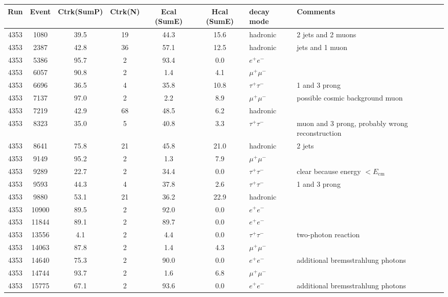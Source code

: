 \begin{tabular}{ccccccll}
	\toprule
	Run & Event & Ctrk(SumP) & Ctrk(N) & Ecal (SumE) & Hcal (SumE) & decay mode & Comments \\
	\midrule
4353 & 1080  & 39.5 & 19 & 44.3 & 15.6 & hadronic 		& 2 jets and 2 muons \\
4353 & 2387  & 42.8 & 36 & 57.1 & 12.5 & hadronic 		& jets and 1 muon \\
4353 & 5386  & 95.7 & 2  & 93.4 & 0.0  & $e^+e^-$ 		& \\
4353 & 6057  & 90.8 & 2  & 1.4  & 4.1  & $\mu^+\mu^-$ 	& \\
4353 & 6696  & 36.5 & 4  & 35.8 & 10.8 & $\tau^+\tau^-$ & 1 and 3 prong \\
4353 & 7137  & 97.0 & 2  & 2.2  & 8.9  & $\mu^+\mu^-$   & possible cosmic background muon \\
4353 & 7219  & 42.9 & 68 & 48.5 & 6.2  & hadronic 		& \\
4353 & 8323  & 35.0 & 5  & 40.8 & 3.3  & $\tau^+\tau^-$ & muon and 3 prong, probably wrong reconstruction \\
4353 & 8641  & 75.8 & 21 & 45.8 & 21.0 & hadronic 		& 2 jets                                         \\
4353 & 9149  & 95.2 & 2  & 1.3  & 7.9  & $\mu^+\mu^-$   &                                                   \\
4353 & 9289  & 22.7 & 2  & 34.4 & 0.0  & $\tau^+\tau^-$ & clear because energy $< E_\mathrm{cm}$ \\
4353 & 9593  & 44.3 & 4  & 37.8 & 2.6  & $\tau^+\tau^-$ & 1 and 3 prong                                              \\
4353 & 9880  & 53.1 & 21 & 36.2 & 22.9 & hadronic 		&                                                   \\
4353 & 10900 & 89.5 & 2  & 92.0 & 0.0  & $e^+e^-$   	&                                                   \\
4353 & 11844 & 89.1 & 2  & 89.7 & 0.0  & $e^+e^-$    	&                                                   \\
4353 & 13556 & 4.1  & 2  & 4.4  & 0.0  & $\tau^+\tau^-$ & two-photon reaction  \\
4353 & 14063 & 87.8 & 2  & 1.4  & 4.3  & $\mu^+\mu^-$   & \\
4353 & 14640 & 75.3 & 2  & 90.0 & 0.0  & $e^+e^-$    	& additional bremsstrahlung photons \\
4353 & 14744 & 93.7 & 2  & 1.6  & 6.8  & $\mu^+\mu^-$   & \\
4353 & 15775 & 67.1 & 2  & 93.6 & 0.0  & $e^+e^-$    	& additional bremsstrahlung photons \\
	\bottomrule
\end{tabular}
